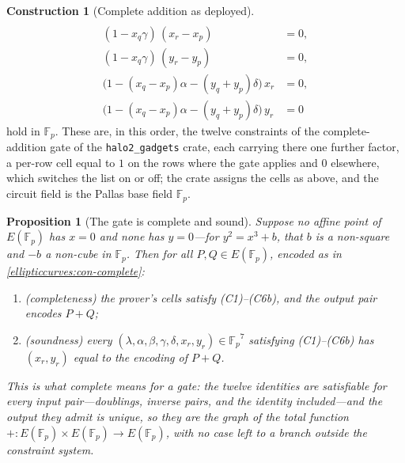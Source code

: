 \documentclass[11pt,a4paper]{article}
\newtheorem{proposition}[theorem]{Proposition}
\theoremstyle{definition}
\newtheorem{construction}[theorem]{Construction}
\theoremstyle{remark}
\newcommand{\Fp}{\ensuremath{\mathbb{F}_{p}}}
\begin{document}
\begin{construction}[Complete addition as deployed]
\begin{align*}
    \tag{C4b}\\
  (1 - x_q\gamma)\,(x_r - x_p) &= 0,
    \tag{C5a}\\
  (1 - x_q\gamma)\,(y_r - y_p) &= 0,
    \tag{C5b}\\
  \bigl(1 - (x_q - x_p)\alpha - (y_q + y_p)\delta\bigr)\,x_r &= 0,
    \tag{C6a}\\
  \bigl(1 - (x_q - x_p)\alpha - (y_q + y_p)\delta\bigr)\,y_r &= 0
    \tag{C6b}
\end{align*}
hold in \(\Fp\). These are, in this order, the twelve constraints of the
complete-addition gate of the \texttt{halo2\_gadgets} crate, each
carrying there one further factor, a per-row cell equal to \(1\) on the
rows where the gate applies and \(0\) elsewhere, which switches the list
on or off; the crate assigns the cells as above, and the circuit field is
the Pallas base field \(\Fp\).
\end{construction}

\begin{proposition}[The gate is complete and sound]
\label{ellipticcurves:prop-complete}
Suppose no affine point of \(E(\Fp)\) has \(x = 0\) and none has
\(y = 0\)---for \(y^2 = x^3 + b\), that \(b\) is a non-square and \(-b\)
a non-cube in \(\Fp\). Then for all \(P, Q \in E(\Fp)\), encoded as in
\cref{ellipticcurves:con-complete}:
\begin{enumerate}
  \item (\emph{completeness}) the prover's cells satisfy
    (C1)--(C6b), and the output pair encodes \(P + Q\);
  \item (\emph{soundness}) every
    \((\lambda, \alpha, \beta, \gamma, \delta, x_r, y_r) \in \Fp^7\)
    satisfying (C1)--(C6b) has \((x_r, y_r)\) equal to the encoding of
    \(P + Q\).
\end{enumerate}
This is what \emph{complete} means for a gate: the twelve identities are
satisfiable for every input pair---doublings, inverse pairs, and the
identity included---and the output they admit is unique, so they are
the graph of the total function \(+ \colon E(\Fp) \times E(\Fp) \to
E(\Fp)\), with no case left to a branch outside the constraint system.
\end{proposition}
\end{document}
